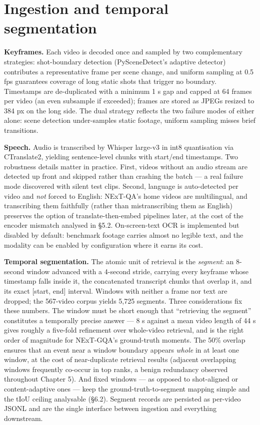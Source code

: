 \section{Ingestion and temporal
segmentation}

\textbf{Keyframes.} Each video is decoded once and sampled by two
complementary strategies: shot-boundary detection (PySceneDetect's
adaptive detector) contributes a representative frame per scene change,
and uniform sampling at 0.5 fps guarantees coverage of long static shots
that trigger no boundary. Timestamps are de-duplicated with a minimum 1
s gap and capped at 64 frames per video (an even subsample if exceeded);
frames are stored as JPEGs resized to 384 px on the long side. The dual
strategy reflects the two failure modes of either alone: scene detection
under-samples static footage, uniform sampling misses brief transitions.

\textbf{Speech.} Audio is transcribed by Whisper
\autocite{radford2023whisper} large-v3 in int8 quantisation via
CTranslate2, yielding sentence-level chunks with start/end timestamps.
Two robustness details matter in practice. First, videos without an
audio stream are detected up front and skipped rather than crashing the
batch --- a real failure mode discovered with silent test clips. Second,
language is auto-detected per video and \emph{not} forced to English:
NExT-QA's home videos are multilingual, and transcribing them faithfully
(rather than mistranscribing them as English) preserves the option of
translate-then-embed pipelines later, at the cost of the encoder
mismatch analysed in §5.2. On-screen-text OCR is implemented but
disabled by default: benchmark footage carries almost no legible text,
and the modality can be enabled by configuration where it earns its
cost.

\textbf{Temporal segmentation.} The atomic unit of retrieval is the
\emph{segment}: an 8-second window advanced with a 4-second stride,
carrying every keyframe whose timestamp falls inside it, the
concatenated transcript chunks that overlap it, and its exact {[}start,
end{]} interval. Windows with neither a frame nor text are dropped; the
567-video corpus yields 5,725 segments. Three considerations fix these
numbers. The window must be short enough that ``retrieving the segment''
constitutes a temporally precise answer --- 8 s against a mean video
length of 44 s gives roughly a five-fold refinement over whole-video
retrieval, and is the right order of magnitude for NExT-GQA's
ground-truth moments. The 50\% overlap ensures that an event near a
window boundary appears \emph{whole} in at least one window, at the cost
of near-duplicate retrieval results (adjacent overlapping windows
frequently co-occur in top ranks, a benign redundancy observed
throughout Chapter 5). And fixed windows --- as opposed to shot-aligned
or content-adaptive ones --- keep the ground-truth-to-segment mapping
simple and the tIoU ceiling analysable (§6.2). Segment records are
persisted as per-video JSONL and are the single interface between
ingestion and everything downstream.

